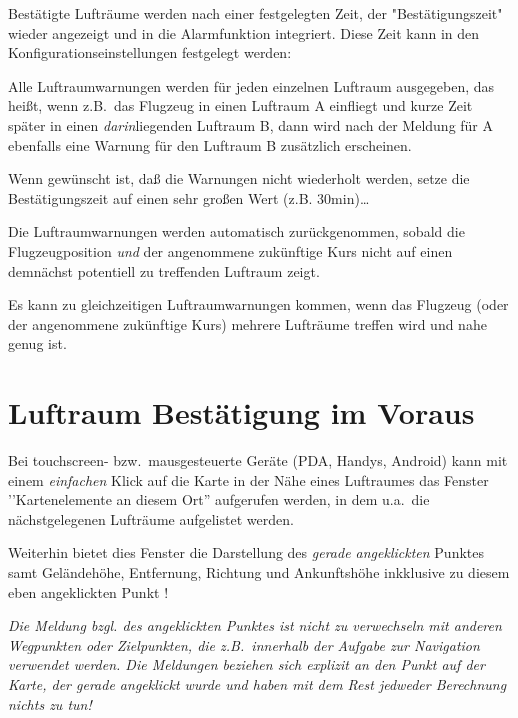 Bestätigte Lufträume werden nach einer festgelegten Zeit, der "Bestätigungszeit"
wieder angezeigt und in die Alarmfunktion integriert. Diese Zeit kann in den
Konfigurationseinstellungen festgelegt werden:

\blink{}\blink{}\blink{}\blink{}

Alle Luftraumwarnungen werden für jeden einzelnen Luftraum ausgegeben, das heißt,
wenn z.B.\ das Flugzeug in einen Luftraum \textsf{A} einfliegt und kurze
Zeit später in einen \textsl{darin}liegenden Luftraum \textsf{B}, dann wird
nach der Meldung für \textsf{A} ebenfalls eine Warnung für den Luftraum
\textsf{B} zusätzlich erscheinen.

\tip Wenn gewünscht ist, daß die Warnungen nicht wiederholt werden, setze die
 Bestätigungszeit auf einen sehr großen Wert (z.B. 30min)\dots

Die Luftraumwarnungen werden automatisch zurückgenommen, sobald die
Flugzeugposition \emph{und}  der angenommene zukünftige Kurs nicht auf einen
demnächst potentiell zu treffenden Luftraum zeigt.

Es kann zu gleichzeitigen  Luftraumwarnungen kommen, wenn  das Flugzeug
(oder der angenommene zukünftige Kurs) mehrere Lufträume treffen wird und nahe
genug ist.

\section{Luftraum Bestätigung im Voraus}

Bei touchscreen- bzw.\ mausgesteuerte Geräte (PDA, Handys, Android)
kann mit einem \textsl{einfachen} Klick auf die Karte in der Nähe eines
Luftraumes das Fenster '\textsf{'Kartenelemente an diesem Ort}'' aufgerufen
werden, in dem u.a.\ die nächstgelegenen Lufträume aufgelistet werden.

Weiterhin bietet dies Fenster die Darstellung des \textsl{gerade angeklickten} Punktes
samt Geländehöhe, Entfernung, Richtung und Ankunftshöhe inkklusive
zu diesem eben angeklickten Punkt !

\achtung \textsl{Die Meldung bzgl. des angeklickten Punktes ist nicht zu verwechseln mit anderen Wegpunkten oder
Zielpunkten, die z.B.\ innerhalb der Aufgabe zur Navigation verwendet werden.
Die Meldungen beziehen sich explizit an den Punkt auf der Karte,
der gerade angeklickt wurde und haben mit dem Rest jedweder Berechnung
nichts zu tun!}


